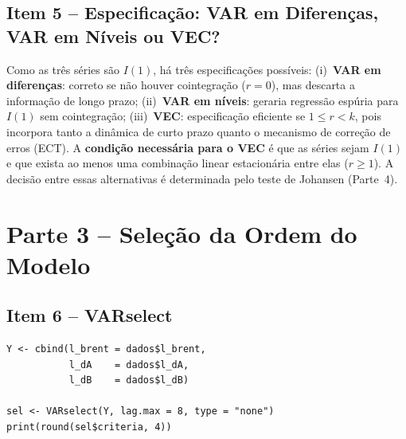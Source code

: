 \documentclass[12pt,a4paper]{article}
\begin{document}
\subsection{Item 5 -- Especificação: VAR em Diferenças, VAR em Níveis ou VEC?}

Como as três séries são $I(1)$, há três especificações possíveis:
(i)~\textbf{VAR em diferenças}: correto se não houver cointegração ($r=0$),
mas descarta a informação de longo prazo;
(ii)~\textbf{VAR em níveis}: geraria regressão espúria para $I(1)$ sem cointegração;
(iii)~\textbf{VEC}: especificação eficiente se $1 \le r < k$, pois incorpora
tanto a dinâmica de curto prazo quanto o mecanismo de correção de erros (ECT).
A \textbf{condição necessária para o VEC} é que as séries sejam $I(1)$ e
que exista ao menos uma combinação linear estacionária entre elas ($r \ge 1$).
A decisão entre essas alternativas é determinada pelo teste de Johansen (Parte~4).

\section{Parte 3 -- Seleção da Ordem do Modelo}

\subsection{Item 6 -- VARselect}

\begin{lstlisting}[caption={VARselect para p = 1,...,8 com type="none"}]
Y <- cbind(l_brent = dados$l_brent,
           l_dA    = dados$l_dA,
           l_dB    = dados$l_dB)

sel <- VARselect(Y, lag.max = 8, type = "none")
print(round(sel$criteria, 4))
\end{lstlisting}

\begin{table}[H]
\centering
\caption{Critérios de Seleção de Defasagens (VARselect, $p = 1$ a $8$)}
\label{tab:varsel}
\end{table}
\end{document}
